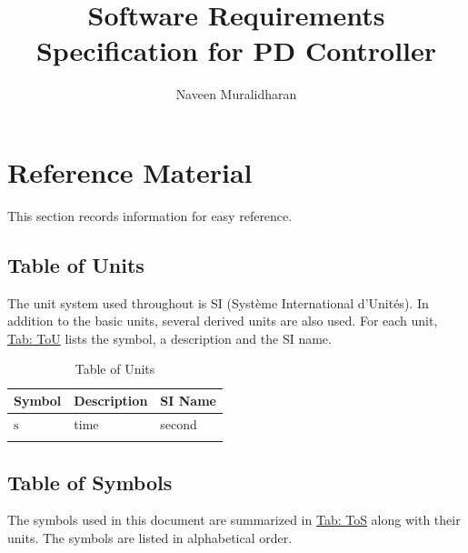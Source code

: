 \documentclass[12pt]{article}
\title{Software Requirements Specification for PD Controller}
\author{Naveen Muralidharan}
\begin{document}
\maketitle
\tableofcontents
\newpage
\section{Reference Material}
\label{Sec:RefMat}
This section records information for easy reference.

\subsection{Table of Units}
\label{Sec:ToU}
The unit system used throughout is SI (Système International d'Unités). In addition to the basic units, several derived units are also used. For each unit, \hyperref[Table:ToU]{Tab: ToU} lists the symbol, a description and the SI name.

\begin{longtable}{l l l}
\toprule
\textbf{Symbol} & \textbf{Description} & \textbf{SI Name}
\\
\midrule
\endhead
${\text{s}}$ & time & second
\\
\bottomrule
\caption{Table of Units}
\label{Table:ToU}
\end{longtable}
\subsection{Table of Symbols}
\label{Sec:ToS}
The symbols used in this document are summarized in \hyperref[Table:ToS]{Tab: ToS} along with their units. The symbols are listed in alphabetical order.
\end{document}
